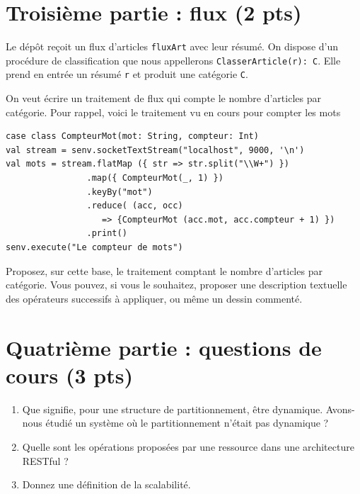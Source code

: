 \documentclass[11pt,a4paper]{article}
\begin{document}
\section*{Troisième partie : flux (2 pts)}

Le dépôt reçoit un flux d'articles \texttt{fluxArt} avec leur résumé. On dispose d'un procédure de classification
que nous appellerons \texttt{ClasserArticle(r): C}. Elle prend en entrée un
résumé \texttt{r} et produit une catégorie \texttt{C}.

On veut écrire un traitement de flux qui compte le nombre d'articles
par catégorie. Pour rappel, voici le traitement vu en cours pour compter les mots

\begin{verbatim}
case class CompteurMot(mot: String, compteur: Int)
val stream = senv.socketTextStream("localhost", 9000, '\n')
val mots = stream.flatMap ({ str => str.split("\\W+") })
                .map({ CompteurMot(_, 1) })
                .keyBy("mot")
                .reduce( (acc, occ)
                   => {CompteurMot (acc.mot, acc.compteur + 1) })
                .print()
senv.execute("Le compteur de mots")
\end{verbatim}

Proposez, sur cette base, le traitement comptant le nombre  d'articles
par catégorie. Vous pouvez, si vous le souhaitez, proposer une description
textuelle des  opérateurs successifs à appliquer, ou même un dessin commenté.

\section*{Quatrième partie : questions de cours (3 pts)}

\begin{enumerate}
\item Que signifie, pour une structure de partitionnement, être dynamique.
   Avons-nous  étudié  un système  où  le partitionnement   n'était pas dynamique ?

   \item Quelle sont les opérations proposées par une ressource dans une architecture RESTful ?

    \item Donnez une définition de la scalabilité.
\end{enumerate}
\end{document}
